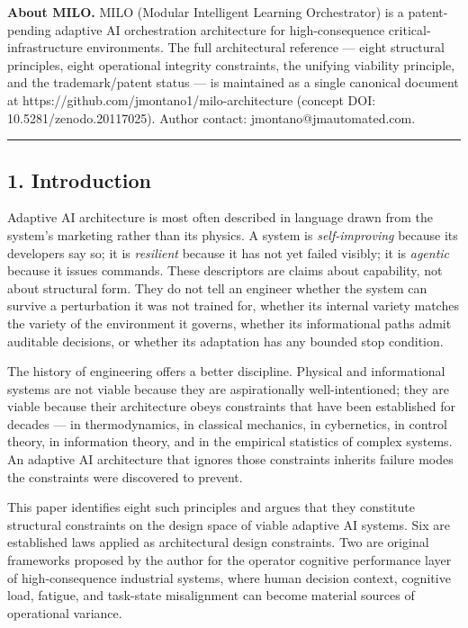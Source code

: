 \textbf{About MILO.} MILO (Modular Intelligent Learning Orchestrator) is
a patent-pending adaptive AI orchestration architecture for
high-consequence critical-infrastructure environments. The full
architectural reference --- eight structural principles, eight
operational integrity constraints, the unifying viability principle, and
the trademark/patent status --- is maintained as a single canonical
document at https://github.com/jmontano1/milo-architecture (concept DOI:
10.5281/zenodo.20117025). Author contact: jmontano@jmautomated.com.

\begin{center}\rule{0.5\linewidth}{0.5pt}\end{center}

\subsection{1. Introduction}\label{introduction}

Adaptive AI architecture is most often described in language drawn from
the system's marketing rather than its physics. A system is
\emph{self-improving} because its developers say so; it is
\emph{resilient} because it has not yet failed visibly; it is
\emph{agentic} because it issues commands. These descriptors are claims
about capability, not about structural form. They do not tell an
engineer whether the system can survive a perturbation it was not
trained for, whether its internal variety matches the variety of the
environment it governs, whether its informational paths admit auditable
decisions, or whether its adaptation has any bounded stop condition.

The history of engineering offers a better discipline. Physical and
informational systems are not viable because they are aspirationally
well-intentioned; they are viable because their architecture obeys
constraints that have been established for decades --- in
thermodynamics, in classical mechanics, in cybernetics, in control
theory, in information theory, and in the empirical statistics of
complex systems. An adaptive AI architecture that ignores those
constraints inherits failure modes the constraints were discovered to
prevent.

This paper identifies eight such principles and argues that they
constitute structural constraints on the design space of viable adaptive
AI systems. Six are established laws applied as architectural design
constraints. Two are original frameworks proposed by the author for the
operator cognitive performance layer of high-consequence industrial
systems, where human decision context, cognitive load, fatigue, and
task-state misalignment can become material sources of operational
variance.

